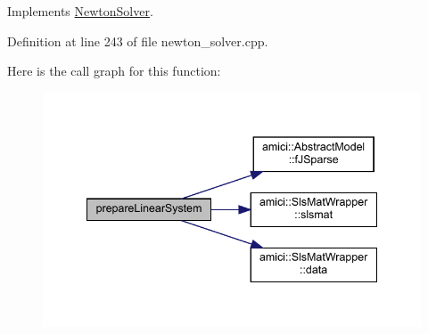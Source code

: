 Implements \mbox{\hyperlink{classamici_1_1_newton_solver_a4aed46b0343374f171f9b4b51fa009e7}{Newton\+Solver}}.



Definition at line 243 of file newton\+\_\+solver.\+cpp.

Here is the call graph for this function\+:
\nopagebreak
\begin{figure}[H]
\begin{center}
\leavevmode
\includegraphics[width=341pt]{classamici_1_1_newton_solver_sparse_a0b900656d018299b08d0f027e95bd347_cgraph}
\end{center}
\end{figure}

